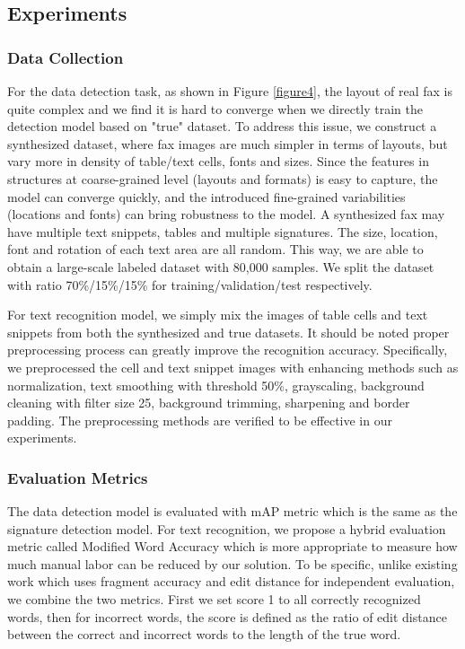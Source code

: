 \documentclass[sigconf]{acmart}
\begin{document}
\subsection{Experiments}
\subsubsection*{\rm \textbf{Data Collection}}
For the data detection task, as shown in Figure \ref{figure4}, the layout of real fax is quite complex and we find it is hard to converge when we directly train the detection model based on "true" dataset. To address this issue, we construct a synthesized dataset, where fax images are much simpler in terms of layouts, but vary more in density of table/text cells, fonts and sizes. Since the features in structures at coarse-grained level (layouts and formats) is easy to capture, the model can converge quickly, and the introduced fine-grained variabilities (locations and fonts) can bring robustness to the model. A synthesized fax may have multiple text snippets, tables and multiple signatures. The size, location, font and rotation of each text area are all random. This way, we are able to obtain a large-scale labeled dataset with 80,000 samples. We split the dataset with ratio 70\%/15\%/15\% for training/validation/test respectively. 

For text recognition model, we simply mix the images of table cells and text snippets from both the synthesized and true datasets. It should be noted proper preprocessing process can greatly improve the recognition accuracy. Specifically, we preprocessed the cell and text snippet images with enhancing methods such as normalization, text smoothing with threshold 50\%, grayscaling, background cleaning with filter size 25, background trimming, sharpening and border padding. The preprocessing methods are verified to be effective in our experiments.

\begin{comment}
这里有没有一些汇总的数据来表征这些预处理带来的好处？
\end{comment}

\subsubsection*{\rm \textbf{Evaluation Metrics}}
The data detection model is evaluated with mAP metric which is the same as the signature detection model. For text recognition, we propose a hybrid evaluation metric called Modified Word Accuracy which is more appropriate to measure how much manual labor can be reduced by our solution. To be specific, unlike existing work \cite{borisyuk2018rosetta, shi2017end} which uses fragment accuracy and edit distance for independent evaluation, we combine the two metrics. First we set score 1 to all correctly recognized words, then for incorrect words, the score is defined as the ratio of edit distance between the correct and incorrect words to the length of the true word. 
\end{document}
